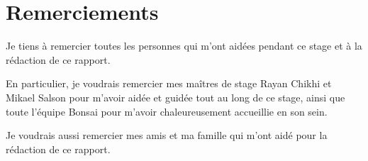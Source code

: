 \section*{Remerciements}

Je tiens à remercier toutes les personnes qui m'ont aidées pendant ce stage et à la rédaction de ce rapport.

En particulier, je voudrais remercier mes maîtres de stage Rayan Chikhi et Mikael Salson pour m'avoir aidée et guidée tout au long de ce stage, ainsi que toute l'équipe Bonsai pour m'avoir chaleureusement accueillie en son sein.

Je voudrais aussi remercier mes amis et ma famille qui m'ont aidé pour la rédaction de ce rapport.





%

